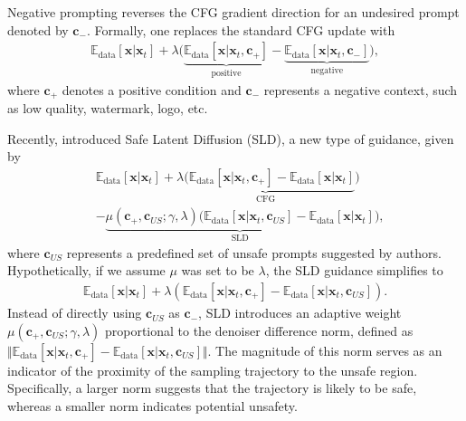 %
%

Negative prompting \cite{liu2022compositional} reverses the CFG gradient direction for an undesired prompt denoted by $\mathbf{c}_{-}$. 
Formally, one replaces the standard CFG update with
\begin{align*}
%
    \mathbb{E}_{\text{data}}[\mathbf{x}\vert\mathbf{x}_{t}]+\lambda\big(\underbrace{\mathbb{E}_{\text{data}}[\mathbf{x}\vert\mathbf{x}_{t},\mathbf{c}_{+}]}_{\text{positive}}-\underbrace{\mathbb{E}_{\text{data}}[\mathbf{x}\vert\mathbf{x}_{t},\mathbf{c}_{-}]}_{\text{negative}}\big),
\end{align*}
where $\mathbf{c}_{+}$ denotes a positive condition and $\mathbf{c}_{-}$ represents a negative context, such as low quality, watermark, logo, etc.
%



Recently, \citet{schramowski2023safe} introduced Safe Latent Diffusion (SLD), a new type of guidance, given by
\begin{align}\label{eq:SLD}
    &\mathbb{E}_{\text{data}}[\mathbf{x}\vert\mathbf{x}_{t}]+\underbrace{\lambda(\mathbb{E}_{\text{data}}[\mathbf{x}\vert\mathbf{x}_{t},\mathbf{c}_{+}]-\mathbb{E}_{\text{data}}[\mathbf{x}\vert\mathbf{x}_{t}]}_{\text{CFG}})\\
    &-\underbrace{\mu(\mathbf{c}_{+},\mathbf{c}_{US};\gamma,\lambda)(\mathbb{E}_{\text{data}}[\mathbf{x}\vert\mathbf{x}_{t},\mathbf{c}_{US}]-\mathbb{E}_{\text{data}}[\mathbf{x}\vert\mathbf{x}_{t}]}_{\text{SLD}}),\nonumber
\end{align}
where $\mathbf{c}_{US}$ represents a predefined set of unsafe prompts suggested by authors. Hypothetically, if we assume $\mu$ was set to be $\lambda$, the SLD guidance simplifies to
\begin{align*}
    \mathbb{E}_{\text{data}}[\mathbf{x}\vert\mathbf{x}_{t}]+\lambda(\mathbb{E}_{\text{data}}[\mathbf{x}\vert\mathbf{x}_{t},\mathbf{c}_{+}]-\mathbb{E}_{\text{data}}[\mathbf{x}\vert\mathbf{x}_{t},\mathbf{c}_{US}]).
    \end{align*}
    Instead of directly using $\mathbf{c}_{US}$ as $\mathbf{c}_{-}$, SLD introduces an adaptive weight $\mu(\mathbf{c}_{+}, \mathbf{c}_{US}; \gamma, \lambda)$ proportional to the denoiser difference norm, defined as $\Vert \mathbb{E}_{\text{data}}[\mathbf{x} \vert \mathbf{x}_{t}, \mathbf{c}_{+}] - \mathbb{E}_{\text{data}}[\mathbf{x} \vert \mathbf{x}_{t}, \mathbf{c}_{US}] \Vert$. The magnitude of this norm serves as an indicator of the proximity of the sampling trajectory to the unsafe region. Specifically, a larger norm suggests that the trajectory is likely to be safe, whereas a smaller norm indicates potential unsafety.

%


%

%
%
%
%


